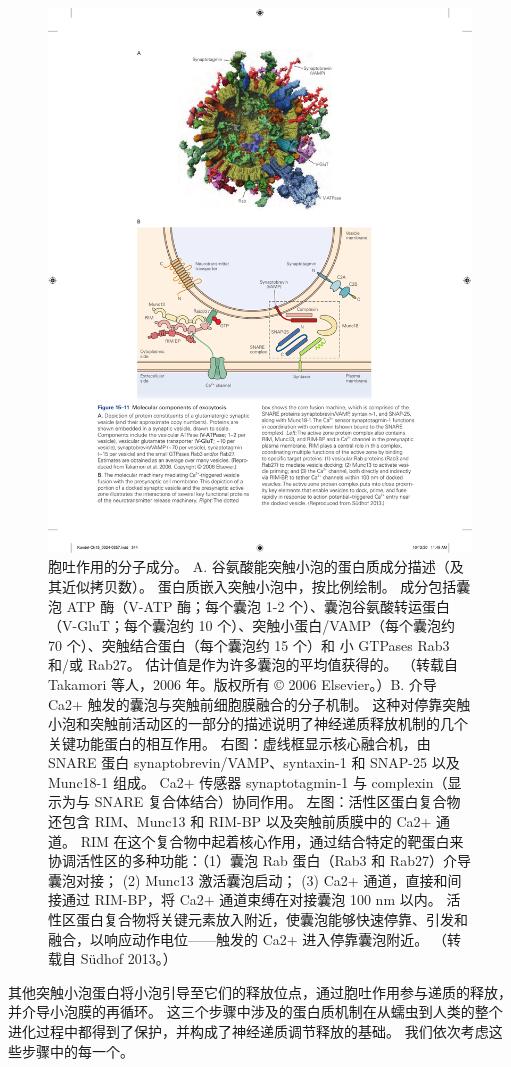 \begin{figure}[htbp]
	\centering
	\includegraphics[width=0.7\linewidth]{chap15/fig_15_11}
	\caption{胞吐作用的分子成分。 A. 谷氨酸能突触小泡的蛋白质成分描述（及其近似拷贝数）。 蛋白质嵌入突触小泡中，按比例绘制。 成分包括囊泡 ATP 酶（V-ATP 酶；每个囊泡 1-2 个）、囊泡谷氨酸转运蛋白（V-GluT；每个囊泡约 10 个）、突触小蛋白/VAMP（每个囊泡约 70 个）、突触结合蛋白（每个囊泡约 15 个）和 小 GTPases Rab3 和/或 Rab27。 估计值是作为许多囊泡的平均值获得的。 （转载自 Takamori 等人，2006 年。版权所有 © 2006 Elsevier。）B. 介导 Ca2+ 触发的囊泡与突触前细胞膜融合的分子机制。 这种对停靠突触小泡和突触前活动区的一部分的描述说明了神经递质释放机制的几个关键功能蛋白的相互作用。 右图：虚线框显示核心融合机，由 SNARE 蛋白 synaptobrevin/VAMP、syntaxin-1 和 SNAP-25 以及 Munc18-1 组成。 Ca2+ 传感器 synaptotagmin-1 与 complexin（显示为与 SNARE 复合体结合）协同作用。 左图：活性区蛋白复合物还包含 RIM、Munc13 和 RIM-BP 以及突触前质膜中的 Ca2+ 通道。 RIM 在这个复合物中起着核心作用，通过结合特定的靶蛋白来协调活性区的多种功能：（1）囊泡 Rab 蛋白（Rab3 和 Rab27）介导囊泡对接； (2) Munc13 激活囊泡启动； (3) Ca2+ 通道，直接和间接通过 RIM-BP，将 Ca2+ 通道束缚在对接囊泡 100 nm 以内。 活性区蛋白复合物将关键元素放入附近，使囊泡能够快速停靠、引发和融合，以响应动作电位——触发的 Ca2+ 进入停靠囊泡附近。 （转载自 Südhof 2013。）}
	\label{fig:15_11}
\end{figure}


其他突触小泡蛋白将小泡引导至它们的释放位点，通过胞吐作用参与递质的释放，并介导小泡膜的再循环。 
这三个步骤中涉及的蛋白质机制在从蠕虫到人类的整个进化过程中都得到了保护，并构成了神经递质调节释放的基础。 我们依次考虑这些步骤中的每一个。



